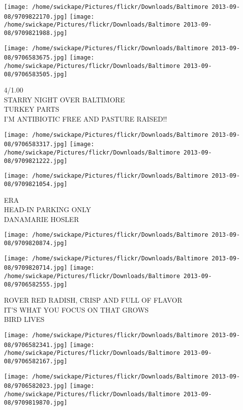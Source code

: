\documentclass[10pt,letterpaper]{article}
\begin{document}
\texttt{[image: /home/swickape/Pictures/flickr/Downloads/Baltimore 2013-09-08/9709822170.jpg]}
\texttt{[image: /home/swickape/Pictures/flickr/Downloads/Baltimore 2013-09-08/9709821988.jpg]}

\texttt{[image: /home/swickape/Pictures/flickr/Downloads/Baltimore 2013-09-08/9706583675.jpg]}
\texttt{[image: /home/swickape/Pictures/flickr/Downloads/Baltimore 2013-09-08/9706583505.jpg]}

4/1.00\\
STARRY NIGHT OVER BALTIMORE\\
TURKEY PARTS\\
I'M ANTIBIOTIC FREE AND PASTURE RAISED!!\\
\pagebreak

\texttt{[image: /home/swickape/Pictures/flickr/Downloads/Baltimore 2013-09-08/9706583317.jpg]}
\texttt{[image: /home/swickape/Pictures/flickr/Downloads/Baltimore 2013-09-08/9709821222.jpg]}

\texttt{[image: /home/swickape/Pictures/flickr/Downloads/Baltimore 2013-09-08/9709821054.jpg]}

ERA\\
HEAD{-}IN PARKING ONLY\\
DANAMARIE HOSLER\\
\pagebreak

\texttt{[image: /home/swickape/Pictures/flickr/Downloads/Baltimore 2013-09-08/9709820874.jpg]}

\vspace{0.25in}
\texttt{[image: /home/swickape/Pictures/flickr/Downloads/Baltimore 2013-09-08/9709820714.jpg]}
\texttt{[image: /home/swickape/Pictures/flickr/Downloads/Baltimore 2013-09-08/9706582555.jpg]}

ROVER RED RADISH, CRISP AND FULL OF FLAVOR\\
IT'S WHAT YOU FOCUS ON THAT GROWS\\
BIRD LIVES\\
\pagebreak

\texttt{[image: /home/swickape/Pictures/flickr/Downloads/Baltimore 2013-09-08/9706582341.jpg]}
\texttt{[image: /home/swickape/Pictures/flickr/Downloads/Baltimore 2013-09-08/9706582167.jpg]}

\texttt{[image: /home/swickape/Pictures/flickr/Downloads/Baltimore 2013-09-08/9706582023.jpg]}
\texttt{[image: /home/swickape/Pictures/flickr/Downloads/Baltimore 2013-09-08/9709819870.jpg]}
\end{document}
